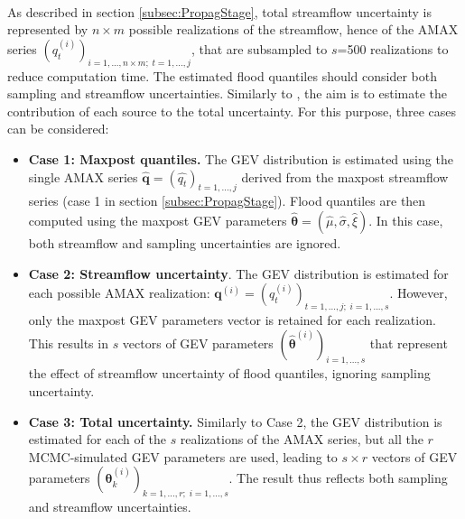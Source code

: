 \documentclass[11pt]{article}
\begin{document}
    \paragraph{}
    As described in section \ref{subsec:PropagStage}, total streamflow uncertainty is represented by $n \times m$ possible realizations of the streamflow, hence of the AMAX series $(q_t^{(i)})_{i=1,...,n \times m;\;t=1,...,j}$, that are subsampled to $s$=500 realizations to reduce computation time. The estimated flood quantiles should consider both sampling and streamflow uncertainties. Similarly to \citet{steinbakk_propagation_2016}, the aim is to estimate the contribution of each source to the total uncertainty. For this purpose, three cases can be considered:
    
    \begin{itemize}
        \item \textbf{Case 1: Maxpost quantiles.}        
        The GEV distribution is estimated using the  single AMAX series $\mathbf{\hat{q}} = (\hat{q_t})_{t=1,...,j}$ derived from the maxpost streamflow series (case 1 in section \ref{subsec:PropagStage}). Flood quantiles are then computed using the maxpost GEV parameters $\boldsymbol{\hat{\theta}} =  (\hat{\mu}, \hat{\sigma}, \hat{\xi})$. In this case, both streamflow and sampling uncertainties are ignored.
        
        \item \textbf{Case 2: Streamflow uncertainty}. The GEV distribution is estimated for each possible AMAX realization: $\mathbf{q}^{(i)} = (q_t^{(i)})_{t=1,...,j;\;i=1,...,s}$. However, only the maxpost GEV parameters vector is retained for each realization. This results in $s$ vectors of GEV parameters $(\boldsymbol{\hat{\theta}}^{(i)})_{i=1,...,s}$ that represent the effect of streamflow uncertainty of flood quantiles, ignoring sampling uncertainty.
    
        \item \textbf{Case 3: Total uncertainty.} Similarly to Case 2, the GEV distribution is estimated for each of the $s$ realizations of the AMAX series, but all the $r$ MCMC-simulated GEV parameters are used, leading to $s \times r$ vectors of GEV parameters $(\boldsymbol{\theta}^{(i)}_k)_{k=1,...,r;\;i=1,...,s}$. The result thus reflects both sampling and streamflow uncertainties.
    \end{itemize}
    
\end{document}
